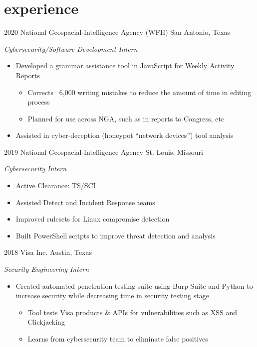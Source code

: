 \documentclass[print]{friggeri-cv} %
\begin{document}

\vspace{-15pt}
\section{experience}
\vspace{-10pt}

\begin{entrylist}

	\entry
	{2020}
	{National Geospacial-Intelligence Agency (WFH)}
	{San Antonio, Texas}
	{\emph{Cybersecurity/Software Development Intern}
		\begin{itemize}
			\item Developed a grammar assistance tool in JavaScript for Weekly Activity Reports
			\begin{itemize}
				\item Corrects ~6,000 writing mistakes to reduce the amount of time in editing process 
				\item Planned for use across NGA, such as in reports to Congress, etc 
			\end{itemize}
			\item Assisted in cyber-deception (honeypot ``network devices'') tool analysis
		\end{itemize}
	}
\vspace{-5pt}

	
	\entry
	{2019}
	{National Geospacial-Intelligence Agency}
	{St. Louis, Missouri}
	{\emph{Cybersecurity Intern}
		\begin{itemize}
			\item Active Clearance: TS/SCI
			\item Assisted Detect and Incident Response teams
			\item Improved rulesets for Linux compromise detection
			\item Built PowerShell scripts to improve threat detection and analysis
		\end{itemize}
	}
\vspace{-5pt}
	
	
	\entry
	{2018}
	{Visa Inc.}
	{Austin, Texas}
	{\emph{Security Engineering Intern}
		\begin{itemize}
			\item Created automated penetration testing suite using Burp Suite and Python to increase security while decreasing time in security testing stage
			\begin{itemize}
				\item Tool tests Visa products \& APIs for vulnerabilities such as XSS and Clickjacking
				\item Learns from cybersecurity team to eliminate false positives
			\end{itemize}
		\end{itemize}
	}
\vspace{-5pt}
	

\end{entrylist}
\end{document}
